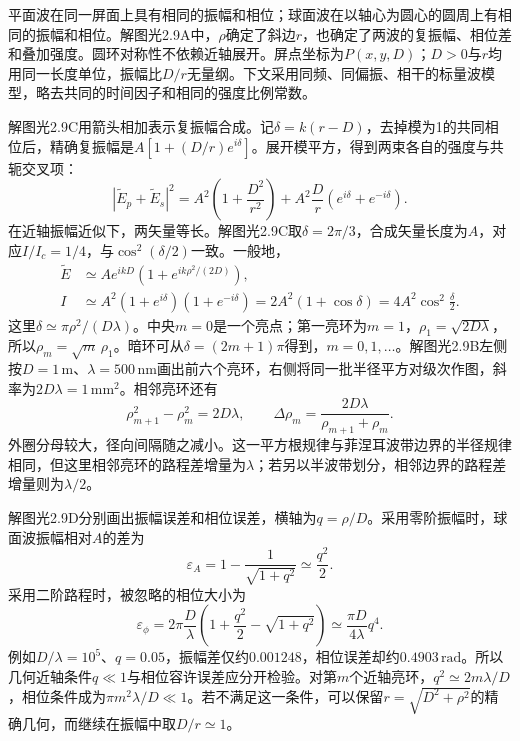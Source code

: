 \documentclass[UTF8,fontset=fandol,a4paper,11pt]{ctexart}
\begin{document}
平面波在同一屏面上具有相同的振幅和相位；球面波在以轴心为圆心的圆周上有相同的振幅和相位。解图光2.9A中，$\rho$确定了斜边$r$，也确定了两波的复振幅、相位差和叠加强度。圆环对称性不依赖近轴展开。屏点坐标为$P(x,y,D)$；$D>0$与$r$均用同一长度单位，振幅比$D/r$无量纲。下文采用同频、同偏振、相干的标量波模型，略去共同的时间因子和相同的强度比例常数。

解图光2.9C用箭头相加表示复振幅合成。记$\delta=k(r-D)$，去掉模为1的共同相位后，精确复振幅是$A[1+(D/r)e^{i\delta}]$。展开模平方，得到两束各自的强度与共轭交叉项：
\[
|\widetilde E_p+\widetilde E_s|^2
=A^2\left(1+\frac{D^2}{r^2}\right)
+A^2\frac Dr(e^{i\delta}+e^{-i\delta}).
\]
在近轴振幅近似下，两矢量等长。解图光2.9C取$\delta=2\pi/3$，合成矢量长度为$A$，对应$I/I_c=1/4$，与$\cos^2(\delta/2)$一致。一般地，
\[
\begin{aligned}
\widetilde E&\simeq Ae^{ikD}\left(1+e^{ik\rho^2/(2D)}\right),\\
I&\simeq A^2(1+e^{i\delta})(1+e^{-i\delta})
=2A^2(1+\cos\delta)=4A^2\cos^2\frac\delta2.
\end{aligned}
\]
这里$\delta\simeq\pi\rho^2/(D\lambda)$。中央$m=0$是一个亮点；第一亮环为$m=1$，$\rho_1=\sqrt{2D\lambda}$，所以$\rho_m=\sqrt m\,\rho_1$。暗环可从$\delta=(2m+1)\pi$得到，$m=0,1,\ldots$。解图光2.9B左侧按$D=1\,\mathrm m$、$\lambda=500\,\mathrm{nm}$画出前六个亮环，右侧将同一批半径平方对级次作图，斜率为$2D\lambda=1\,\mathrm{mm}^2$。相邻亮环还有
\[
\rho_{m+1}^2-\rho_m^2=2D\lambda,\qquad
\Delta\rho_m=\frac{2D\lambda}{\rho_{m+1}+\rho_m}.
\]
外圈分母较大，径向间隔随之减小。这一平方根规律与菲涅耳波带边界的半径规律相同，但这里相邻亮环的路程差增量为$\lambda$；若另以半波带划分，相邻边界的路程差增量则为$\lambda/2$。

解图光2.9D分别画出振幅误差和相位误差，横轴为$q=\rho/D$。采用零阶振幅时，球面波振幅相对$A$的差为
\[
\varepsilon_A=1-\frac1{\sqrt{1+q^2}}\simeq\frac{q^2}{2}.
\]
采用二阶路程时，被忽略的相位大小为
\[
\varepsilon_\phi=2\pi\frac D\lambda
\left(1+\frac{q^2}{2}-\sqrt{1+q^2}\right)
\simeq\frac{\pi D}{4\lambda}q^4.
\]
例如$D/\lambda=10^5$、$q=0.05$，振幅差仅约$0.001248$，相位误差却约$0.4903\,\mathrm{rad}$。所以几何近轴条件$q\ll1$与相位容许误差应分开检验。对第$m$个近轴亮环，$q^2\simeq2m\lambda/D$，相位条件成为$\pi m^2\lambda/D\ll1$。若不满足这一条件，可以保留$r=\sqrt{D^2+\rho^2}$的精确几何，而继续在振幅中取$D/r\simeq1$。
\end{document}
